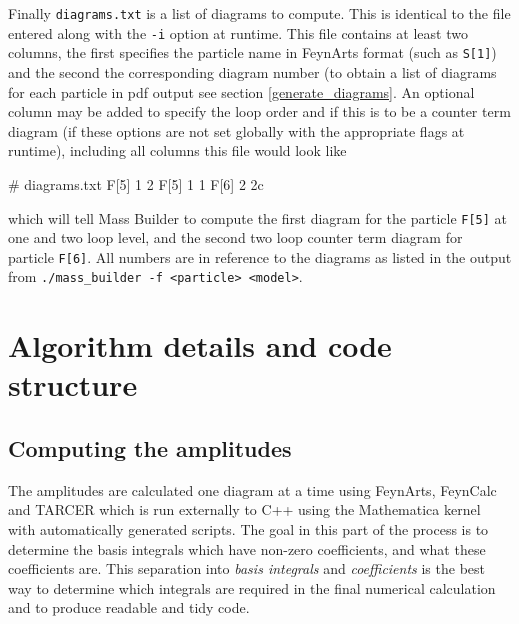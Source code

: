 Finally \lstinline{diagrams.txt} is a list of diagrams to compute.  This is identical to the file entered along with the \lstinline{-i} option at runtime.  This file contains at least two columns, the first specifies the particle name in FeynArts format (such as \lstinline{S[1]}) and the second the corresponding diagram number (to obtain a list of diagrams for each particle in pdf output see section \ref{generate_diagrams}.  An optional column may be added to specify the loop order and if this is to be a counter term diagram (if these options are not set globally with the appropriate flags at runtime), including all columns this file would look like
\begin{lstterm}
# diagrams.txt
F[5]   1   2
F[5]   1   1
F[6]   2   2c
\end{lstterm}
which will tell Mass Builder to compute the first diagram for the particle \lstinline{F[5]} at one and two loop level, and the second two loop counter term diagram for particle \lstinline{F[6]}.  All numbers are in reference to the diagrams as listed in the output from \lstinline{./mass_builder -f <particle> <model>}.





\section{Algorithm details and code structure}


\subsection{Computing the amplitudes}

The amplitudes are calculated one diagram at a time using FeynArts, FeynCalc and TARCER which is run externally to C++ using the Mathematica kernel with automatically generated scripts.  The goal in this part of the process is to determine the basis integrals which have non-zero coefficients, and what these coefficients are.  This separation into \textit{basis integrals} and \textit{coefficients} is the best way to determine which integrals are required in the final numerical calculation and to produce readable and tidy code.

